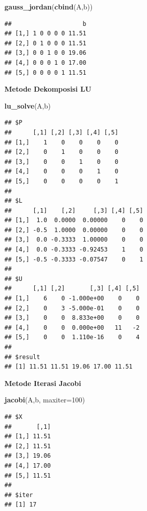 \documentclass[]{book}
\newenvironment{Shaded}{\begin{snugshade}}{\end{snugshade}}
\newcommand{\DataTypeTok}[1]{\textcolor[rgb]{0.13,0.29,0.53}{#1}}
\newcommand{\DecValTok}[1]{\textcolor[rgb]{0.00,0.00,0.81}{#1}}
\newcommand{\KeywordTok}[1]{\textcolor[rgb]{0.13,0.29,0.53}{\textbf{#1}}}
\newcommand{\NormalTok}[1]{#1}
\theoremstyle{definition}
\theoremstyle{definition}
\theoremstyle{definition}
\theoremstyle{remark}
\begin{document}
\begin{Shaded}
\begin{Highlighting}[]
\KeywordTok{gauss_jordan}\NormalTok{(}\KeywordTok{cbind}\NormalTok{(A,b))}
\end{Highlighting}
\end{Shaded}

\begin{verbatim}
##                    b
## [1,] 1 0 0 0 0 11.51
## [2,] 0 1 0 0 0 11.51
## [3,] 0 0 1 0 0 19.06
## [4,] 0 0 0 1 0 17.00
## [5,] 0 0 0 0 1 11.51
\end{verbatim}

\textbf{Metode Dekomposisi LU}

\begin{Shaded}
\begin{Highlighting}[]
\KeywordTok{lu_solve}\NormalTok{(A,b)}
\end{Highlighting}
\end{Shaded}

\begin{verbatim}
## $P
##      [,1] [,2] [,3] [,4] [,5]
## [1,]    1    0    0    0    0
## [2,]    0    1    0    0    0
## [3,]    0    0    1    0    0
## [4,]    0    0    0    1    0
## [5,]    0    0    0    0    1
## 
## $L
##      [,1]    [,2]     [,3] [,4] [,5]
## [1,]  1.0  0.0000  0.00000    0    0
## [2,] -0.5  1.0000  0.00000    0    0
## [3,]  0.0 -0.3333  1.00000    0    0
## [4,]  0.0 -0.3333 -0.92453    1    0
## [5,] -0.5 -0.3333 -0.07547    0    1
## 
## $U
##      [,1] [,2]       [,3] [,4] [,5]
## [1,]    6    0 -1.000e+00    0    0
## [2,]    0    3 -5.000e-01    0    0
## [3,]    0    0  8.833e+00    0    0
## [4,]    0    0  0.000e+00   11   -2
## [5,]    0    0  1.110e-16    0    4
## 
## $result
## [1] 11.51 11.51 19.06 17.00 11.51
\end{verbatim}

\textbf{Metode Iterasi Jacobi}

\begin{Shaded}
\begin{Highlighting}[]
\KeywordTok{jacobi}\NormalTok{(A,b, }\DataTypeTok{maxiter=}\DecValTok{100}\NormalTok{)}
\end{Highlighting}
\end{Shaded}

\begin{verbatim}
## $X
##       [,1]
## [1,] 11.51
## [2,] 11.51
## [3,] 19.06
## [4,] 17.00
## [5,] 11.51
## 
## $iter
## [1] 17
\end{verbatim}
\end{document}
